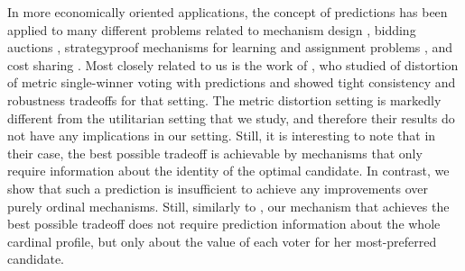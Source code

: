 In more economically oriented applications, the concept of predictions has been applied to many different problems related to mechanism design \citep{agrawal2022learning,BGT23,balkanski2024randomized,balkanski2023online, BGI24, christodoulou2024mechanism, QNS24}, bidding auctions \citep{XL22,lu2024competitive,caragiannis2024randomized,gkatzelis2025clock}, strategyproof mechanisms for learning and assignment problems \citep{BZ25,colini2024trust}, and cost sharing \citep{gkatzelis2022improved}. Most closely related to us is the work of \cite{BFGT24}, who studied of distortion of metric single-winner voting with predictions and showed tight consistency and robustness tradeoffs for that setting. The metric distortion setting is markedly different from the utilitarian setting that we study, and therefore their results do not have any implications in our setting. Still, it is interesting to note that in their case, the best possible tradeoff is achievable by mechanisms that only require information about the identity of the optimal candidate. In contrast, we show that such a prediction is insufficient to achieve any improvements over purely ordinal mechanisms. Still, similarly to \citet{BFGT24}, our mechanism that achieves the best possible tradeoff does not require prediction information about the whole cardinal profile, but only about the value of each voter for her most-preferred candidate. 



